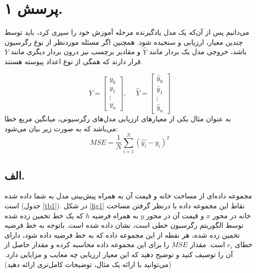 \section{پرسش ۱.}
می‌دانیم پس از آن‌که یک مدل یادگیرنده مرحله آموزش خود را سپری کرد، باید توسط چندین معیار، ارزیابی و سنجیده شود. همچنین اگر مسئله موردنظر از نوع رگرسیون باشد، خروجی مدل یک بردار مانند $\hat{Y}$ و مقادیر برچسب نیز درون بردار دیگری مانند $Y$ قرار دارند که همگی از نوع اعداد پیوسته هستند. 

\begin{equation*}
	Y = \begin{bmatrix} y_{0} \\ y_{1} \\ \vdots \\ y_{n} \end{bmatrix},\:\:\:\:\:\: \hat{Y} = \begin{bmatrix} \hat{y}_{0} \\ \hat{y}_{1} \\ \vdots \\ \hat{y}_{n} \end{bmatrix}
\end{equation*}
به عنوان مثال یکی از معیارهای ارزیابی مدل‌های رگرسیونی، میانگین مربع خطا
می‌باشد که به صورت زیر بیان می‌شود:
\begin{equation}
	\label{eq1}
	MSE = \frac{1}{N} \sum_{i=1}^{N} (\hat{y_i} - y_i)^2
\end{equation}

\subsection*{الف.}
مجموعه داده‌ای از مساحت خانه و قیمت آن به همراه پیش‌بینی مدل به شما داده شده است (جدول \ref{tb1}). در شکل \ref{fig1} نقاط این مجموعه داده با درنظر گرفتن مساحت خانه در محور $x$ و قیمت آن در محور $y$ به همراه فرضیه $h$ که یک خط تخمین زده شده توسط الگوریتم رگرسیون خطی است، نشان داده شده است. باتوجه به خط فرضیه تخمین زده شده، هر نقطه از این مجموعه داده که به خط فرضیه داده شود، دارای خطای $e_i$ است. مقدار $MSE$ را برای این مجموعه داده محاسبه کرده و مقدار حاصل از آن را توصیف کنید و توضیح دهید که این معیار ارزیابی چه معایب و مزایایی دارد. (می‌توانید با ارائه یک مثال، توضیحات کامل‌تری ارائه دهید)
\\
\\ \\ \\ \\ \\ \\ 

